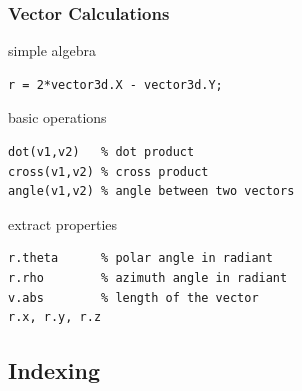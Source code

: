 \documentclass[compress]{beamer}
\begin{document}
\begin{frame}[fragile]
  \frametitle{Vector Calculations}

  simple algebra
\begin{lstlisting}[style=input]
r = 2*vector3d.X - vector3d.Y;
\end{lstlisting}

  \pause \medskip


  basic operations
\begin{lstlisting}[style=input]
dot(v1,v2)   % dot product
cross(v1,v2) % cross product
angle(v1,v2) % angle between two vectors
\end{lstlisting}

  \pause \medskip

  extract properties
\begin{lstlisting}[style=input]
r.theta      % polar angle in radiant
r.rho        % azimuth angle in radiant
v.abs        % length of the vector
r.x, r.y, r.z
\end{lstlisting}

\end{frame}


\subsection*{Indexing}
\end{document}
